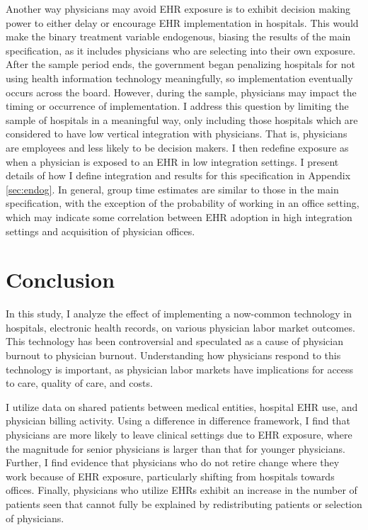 \documentclass[12pt]{article}
\begin{document}
Another way physicians may avoid EHR exposure is to exhibit decision making power to either delay or encourage EHR implementation in hospitals. This would make the binary treatment variable endogenous, biasing the results of the main specification, as it includes physicians who are selecting into their own exposure. After the sample period ends, the government began penalizing hospitals for not using health information technology meaningfully, so implementation eventually occurs across the board. However, during the sample, physicians may impact the timing or occurrence of implementation. I address this question by limiting the sample of hospitals in a meaningful way, only including those hospitals which are considered to have low vertical integration with physicians. That is, physicians are employees and less likely to be decision makers. I then redefine exposure as when a physician is exposed to an EHR in low integration settings. I present details of how I define integration and results for this specification in Appendix \ref{sec:endog}. In general, group time estimates are similar to those in the main specification, with the exception of the probability of working in an office setting, which may indicate some correlation between EHR adoption in high integration settings and acquisition of physician offices. 


\section{Conclusion}

In this study, I analyze the effect of implementing a now-common technology in hospitals, electronic health records, on various physician labor market outcomes. This technology has been controversial and speculated as a cause of physician burnout to physician burnout. Understanding how physicians respond to this technology is important, as physician labor markets have implications for access to care, quality of care, and costs. 

I utilize data on shared patients between medical entities, hospital EHR use, and physician billing activity. Using a difference in difference framework, I find that physicians are more likely to leave clinical settings due to EHR exposure, where the magnitude for senior physicians is larger than that for younger physicians. Further, I find evidence that physicians who do not retire change where they work because of EHR exposure, particularly shifting from hospitals towards offices. Finally, physicians who utilize EHRs exhibit an increase in the number of patients seen that cannot fully be explained by redistributing patients or selection of physicians. 
\end{document}
